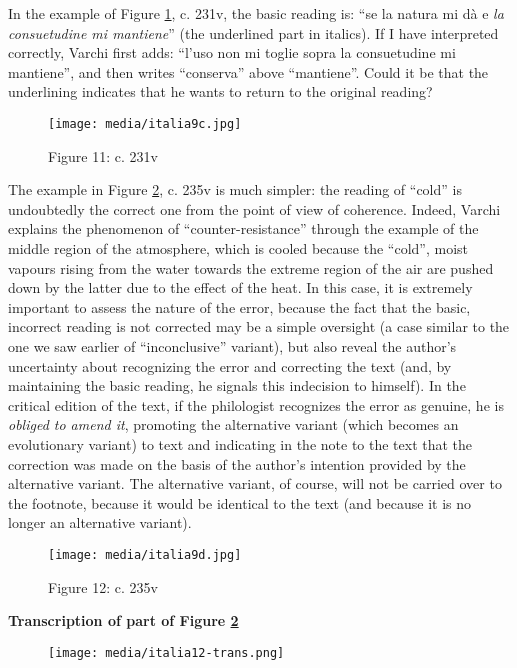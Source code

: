 \documentclass{article}
\begin{document}
In the example of Figure \ref{fig:italia9c}, c. 231v, the basic reading is: ``se la natura mi dà e \emph{la consuetudine mi mantiene}'' (the underlined part in italics). If I have interpreted correctly, Varchi first adds:
``l'uso non mi toglie sopra la consuetudine mi mantiene'', and then writes ``conserva'' above ``mantiene''. Could it be that the underlining indicates that he wants to return to the original reading?

\begin{figure}[H]
    \centering
    \texttt{[image: media/italia9c.jpg]}
    \caption{Figure 11: c. 231v}
    \label{fig:italia9c}
\end{figure}


The example in Figure \ref{fig:italia9d}, c. 235v is much simpler: the
reading of ``cold'' is undoubtedly the correct one from the point of view
of coherence. Indeed, Varchi explains the phenomenon of
``counter-resistance'' through the example of the middle region of the
atmosphere, which is cooled because the ``cold'', moist vapours rising
from the water towards the extreme region of the air are pushed down by
the latter due to the effect of the heat. 
In this case, it is extremely important to assess the nature of the
error, because the fact that the basic, incorrect reading is not
corrected may be a simple oversight (a case similar to the one we saw
earlier of ``inconclusive'' variant), but also reveal the author's
uncertainty about recognizing the error and correcting the text (and, by
maintaining the basic reading, he signals this indecision to himself).
In the critical edition of the text, if the philologist recognizes the
error as genuine, he is \emph{obliged to amend it}, promoting
the alternative variant (which becomes an evolutionary variant) to text
and indicating in the note to the text that the correction was made on
the basis of the author's intention provided by the alternative variant.
The alternative variant, of course, will not be carried over to the
footnote, because it would be identical to the text (and because it is
no longer an alternative variant).


\begin{figure}[H]
    \centering
    \texttt{[image: media/italia9d.jpg]}
    \caption{Figure 12: c. 235v}
    \label{fig:italia9d}
\end{figure}

\textbf{Transcription of part of Figure \ref{fig:italia9d}}

\begin{figure}
    \centering
    \texttt{[image: media/italia12-trans.png]}
\end{figure}
\end{document}

